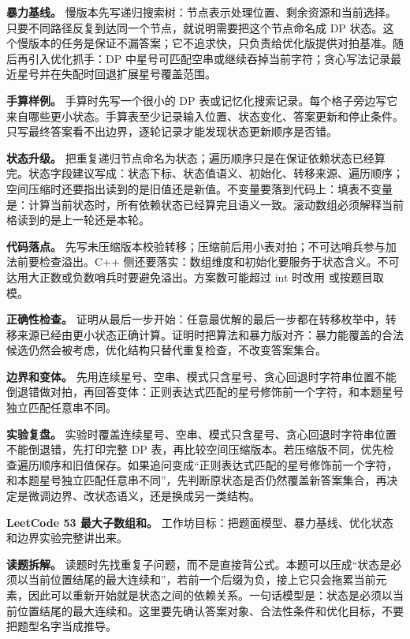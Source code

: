 \textbf{暴力基线。} 慢版本先写递归搜索树：节点表示处理位置、剩余资源和当前选择。只要不同路径反复到达同一个节点，就说明需要把这个节点命名成 DP 状态。这个慢版本的任务是保证不漏答案；它不追求快，只负责给优化版提供对拍基准。随后再引入优化抓手：DP 中星号可匹配空串或继续吞掉当前字符；贪心写法记录最近星号并在失配时回退扩展星号覆盖范围。

\textbf{手算样例。} 手算时先写一个很小的 DP 表或记忆化搜索记录。每个格子旁边写它来自哪些更小状态。手算表至少记录输入位置、状态变化、答案更新和停止条件。只写最终答案看不出边界，逐轮记录才能发现状态更新顺序是否错。

\textbf{状态升级。} 把重复递归节点命名为状态；遍历顺序只是在保证依赖状态已经算完。状态字段建议写成：状态下标、状态值语义、初始化、转移来源、遍历顺序；空间压缩时还要指出读到的是旧值还是新值。不变量要落到代码上：填表不变量是：计算当前状态时，所有依赖状态已经算完且语义一致。滚动数组必须解释当前格读到的是上一轮还是本轮。

\textbf{代码落点。} 先写未压缩版本校验转移；压缩前后用小表对拍；不可达哨兵参与加法前要检查溢出。C++ 侧还要落实：数组维度和初始化要服务于状态含义。不可达用大正数或负数哨兵时要避免溢出。方案数可能超过 int 时改用  或按题目取模。

\textbf{正确性检查。} 证明从最后一步开始：任意最优解的最后一步都在转移枚举中，转移来源已经由更小状态正确计算。证明时把算法和暴力版对齐：暴力能覆盖的合法候选仍然会被考虑，优化结构只替代重复检查，不改变答案集合。

\textbf{边界和变体。} 先用连续星号、空串、模式只含星号、贪心回退时字符串位置不能倒退错做对拍，再回答变体：正则表达式匹配的星号修饰前一个字符，和本题星号独立匹配任意串不同。

\textbf{实验复盘。} 实验时覆盖连续星号、空串、模式只含星号、贪心回退时字符串位置不能倒退错，先打印完整 DP 表，再比较空间压缩版本。若压缩版不同，优先检查遍历顺序和旧值保存。如果追问变成“正则表达式匹配的星号修饰前一个字符，和本题星号独立匹配任意串不同”，先判断原状态是否仍然覆盖新答案集合，再决定是微调边界、改状态语义，还是换成另一类结构。

\noindent\textbf{LeetCode 53 最大子数组和。} 工作坊目标：把题面模型、暴力基线、优化状态和边界实验完整讲出来。

\textbf{读题拆解。} 读题时先找重复子问题，而不是直接背公式。本题可以压成“状态是必须以当前位置结尾的最大连续和”，若前一个后缀为负，接上它只会拖累当前元素，因此可以重新开始就是状态之间的依赖关系。一句话模型是：状态是必须以当前位置结尾的最大连续和。这里要先确认答案对象、合法性条件和优化目标，不要把题型名字当成推导。

